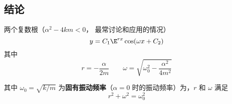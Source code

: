 
\subsection{结论}
两个复数根（$\alpha ^2 - 4km < 0$， 最常讨论和应用的情况）
\begin{equation}
y = C_1 \E^{rx} \cos(\omega x + C_2)
\end{equation}
其中
\begin{equation}
r =  - \frac{\alpha }{2m} \qquad  \omega  = \sqrt{\omega _0^2 - \frac{\alpha ^2}{4 m^2}}
\end{equation}

其中 $\omega _0 = \sqrt{k/m}$ 为\textbf{固有振动频率}（$\alpha  = 0$ 时的振动频率）为，$r$ 和 $\omega$ 满足
\begin{equation}
r^2 + \omega ^2 = \omega _0^2
\end{equation}

